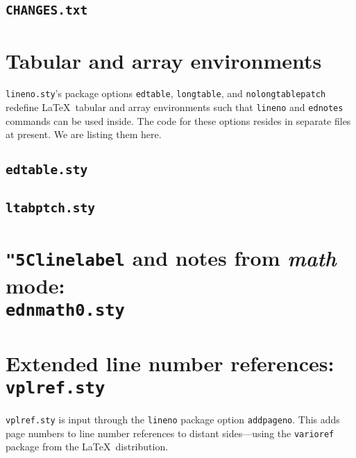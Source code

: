 \documentclass[10pt]{article}
\makeatletter
\newcommand*{\cs}[1]{\texttt{\char"5C#1}}
\newcommand*{\notinaux}[1]{%
  \ifx\protect\@typeset@protect #1%
  \else 
    \ifdim\lastskip>\z@\ignorespaces\fi 
  \fi}
\makeatother
\begin{document}
\subsection{\texttt{CHANGES.txt}}


\section{Tabular and array environments}
\texttt{lineno.sty}'s package options \texttt{edtable}, 
\texttt{longtable}, and \texttt{nolongtablepatch} 
redefine \LaTeX\ tabular and array environments 
such that \texttt{lineno} and \texttt{ednotes} commands 
can be used inside. The code for these options resides 
in separate files at present. We are listing them here. 
\subsection{\texttt{edtable.sty}}

\subsection{\texttt{ltabptch.sty}}


\section{\cs{linelabel} and notes from \textit{math} mode: 
         \notinaux{\\} \texttt{ednmath0.sty}}


\section{Extended line number references: \texttt{vplref.sty}} 
\texttt{vplref.sty} is input through the \texttt{lineno} 
package option \texttt{addpageno}. This adds page numbers 
to line number references to distant sides---using the 
\texttt{varioref} package from the \LaTeX\ distribution. 
 
\end{document}
